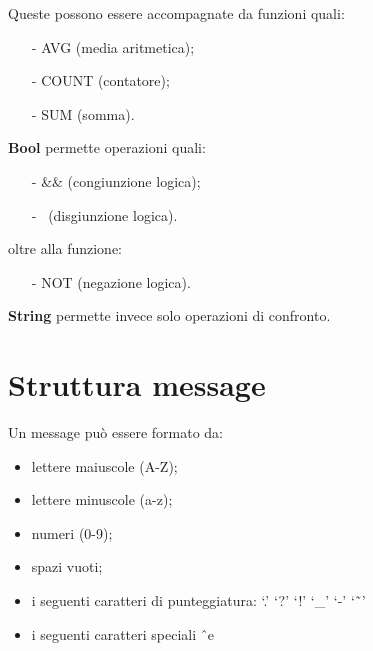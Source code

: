 Queste possono essere accompagnate da funzioni quali:
\begin{itemize}
\item[-] AVG (media aritmetica);
\item[-] COUNT (contatore);
\item[-] SUM (somma). 
\end{itemize}
\textbf{Bool} permette operazioni quali:
\begin{itemize}
\item[-] \&\& (congiunzione logica);
\item[-] \textbar\textbar\ (disgiunzione logica).
\end{itemize}
oltre alla funzione:
\begin{itemize}
\item[-] NOT (negazione logica). 
\end{itemize}
\textbf{String} permette invece solo operazioni di confronto.
\section{Struttura message}
Un message pu\`o essere formato da:
\begin{itemize}
\item lettere maiuscole (A-Z);
\item lettere minuscole (a-z);
\item numeri (0-9);
\item spazi vuoti;
\item i seguenti caratteri di punteggiatura: `.'  `?'  `!'  `\_'  `-'  `\~\ '
\item i seguenti caratteri speciali \^\ e \~ \\
\end{itemize}

